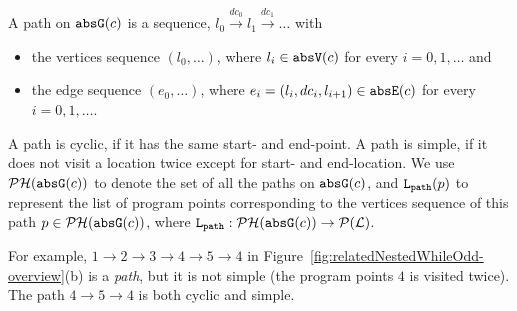 \begin{defn}[Path]
  \label{def:abs_cfgpath} 
  A path on $\mathtt{abs}{\mathtt{G}}(c)$ is a sequence, $ l_0 \xrightarrow{dc_0} l_1 \xrightarrow{dc_1} \ldots $ with
  \begin{itemize}
  \item the vertices sequence $(l_0, \ldots)$, where $l_i \in \mathtt{abs}{\mathtt{V}}(c)$ for every $i = 0, 1, \ldots$ and
  \item the edge sequence $(e_0, \ldots)$, where $e_i = (l_{i}, dc_i, l_{i + 1}) \in \mathtt{abs}{\mathtt{E}}(c)$ for every $i = 0, 1, \ldots$.
  \end{itemize}
  A path is cyclic, if it has the same start- and end-point. A path is simple, if it does not visit a location twice except for start- and end-location. We use $\mathcal{PH}(\mathtt{abs}{\mathtt{G}}(c))$ to denote the set of all the paths on $\mathtt{abs}{\mathtt{G}}(c)$,
  and $\mathtt{L}_{\mathtt{path}}(p)$ to represent the list of program points corresponding to the vertices sequence of this path $p \in \mathcal{PH}(\mathtt{abs}{\mathtt{G}}(c))$,
  where $\mathtt{L}_{\mathtt{path}} : \mathcal{PH}(\mathtt{abs}{\mathtt{G}}(c)) \to \mathcal{P}{(\mathcal{L})}$.
  \end{defn}
  For example, $1 \to 2 \to 3 \to 4 \to 5 \to 4$ in Figure~\ref{fig:relatedNestedWhileOdd-overview}(b) is a \emph{path}, but it is not simple (the program points $4$ is visited twice). The path $4 \to 5 \to 4$ is both cyclic and simple.

